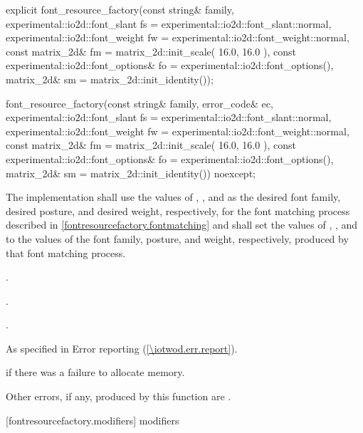 \begin{itemdecl}
explicit font_resource_factory(const string& family, 
  experimental::io2d::font_slant fs = experimental::io2d::font_slant::normal,
  experimental::io2d::font_weight fw = experimental::io2d::font_weight::normal,
  const matrix_2d& fm = matrix_2d::init_scale({ 16.0, 16.0 }),
  const experimental::io2d::font_options& fo = 
  experimental::io2d::font_options(),
  matrix_2d& sm = matrix_2d::init_identity());

font_resource_factory(const string& family, 
  error_code& ec,
  experimental::io2d::font_slant fs = experimental::io2d::font_slant::normal,
  experimental::io2d::font_weight fw = experimental::io2d::font_weight::normal,
  const matrix_2d& fm = matrix_2d::init_scale({ 16.0, 16.0 }),
  const experimental::io2d::font_options& fo = 
  experimental::io2d::font_options(),
  matrix_2d& sm = matrix_2d::init_identity()) noexcept;
\end{itemdecl}
\begin{itemdescr}
\pnum
\effects
The implementation shall use the values of , , and  as the desired font family, desired posture, and desired weight, respectively, for the font matching process described in \ref{fontresourcefactory.fontmatching} and shall set the values of , , and  to the values of the font family, posture, and weight, respectively, produced by that font matching process.

\pnum
{}.

\pnum
{}.

\pnum
{}.

\pnum
\throws
As specified in Error reporting (\ref{\iotwod.err.report}).

\pnum
\errors
{} if there was a failure to allocate memory.

\pnum
Other errors, if any, produced by this function are .
\end{itemdescr}

 [fontresourcefactory.modifiers] { modifiers}

